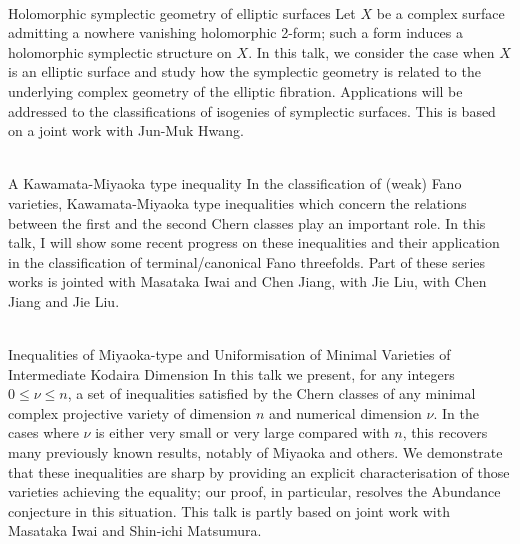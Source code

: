 \documentclass[dvipdfmx,a4paper,12pt]{article}
\theoremstyle{plain} %
\theoremstyle{definition} %
\begin{document}
\\
Holomorphic symplectic geometry of elliptic surfaces
\vskip3mm
Let $X$ be a complex surface admitting a nowhere vanishing holomorphic 2-form; such a form induces a holomorphic symplectic structure on $X$. In this talk, we consider the case when $X$ is an elliptic surface and study how the symplectic geometry is related to the underlying complex geometry of the elliptic fibration. Applications will be addressed to the classifications of isogenies of symplectic surfaces. This is based on a joint work with Jun-Muk Hwang.
\vskip8mm

\newpage

\vskip5mm
\\
A Kawamata-Miyaoka type inequality
\vskip3mm
In the classification of (weak) Fano varieties, Kawamata-Miyaoka type inequalities which concern the relations between the first and the second Chern classes play an important role. In this talk, I will show some recent progress on these inequalities and their application in the classification of terminal/canonical Fano threefolds. Part of these series works is jointed with Masataka Iwai and Chen Jiang, with Jie Liu, with Chen Jiang and Jie Liu.
\vskip8mm

\\
Inequalities of Miyaoka-type and Uniformisation of Minimal Varieties of Intermediate Kodaira Dimension
\vskip3mm
In this talk we present, for any integers $0 \leq \nu \leq n$, a set of inequalities satisfied by the Chern classes of any minimal complex projective variety of dimension $n$ and numerical dimension $\nu$. In the cases where $\nu$ is either very small or very large compared with $n$, this recovers many previously known results, notably of Miyaoka and others. We demonstrate that these inequalities are sharp by providing an explicit characterisation of those varieties achieving the equality; our proof, in particular, resolves the Abundance conjecture in this situation. This talk is partly based on joint work with Masataka Iwai and Shin-ichi Matsumura.
\vskip12mm
\end{document}
